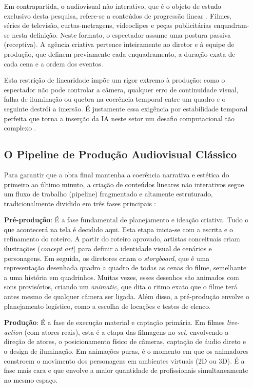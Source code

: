Em contrapartida, o audiovisual não interativo, que é o objeto de estudo exclusivo desta pesquisa, refere-se a conteúdos de progressão linear \citep{gavran2025}. Filmes, séries de televisão, curtas-metragens, videoclipes e peças publicitárias enquadram-se nesta definição. Neste formato, o espectador assume uma postura passiva (receptiva). A agência criativa pertence inteiramente ao diretor e à equipe de produção, que definem previamente cada enquadramento, a duração exata de cada cena e a ordem dos eventos.

Esta restrição de linearidade impõe um rigor extremo à produção: como o espectador não pode controlar a câmera, qualquer erro de continuidade visual, falha de iluminação ou quebra na coerência temporal entre um quadro e o seguinte destrói a imersão. É justamente essa exigência por estabilidade temporal perfeita que torna a inserção da IA neste setor um desafio computacional tão complexo \citep{yin2025spatiotemporal}.

\subsection{O Pipeline de Produção Audiovisual Clássico}
\label{subsec:pipeline}

Para garantir que a obra final mantenha a coerência narrativa e estética do primeiro ao último minuto, a criação de conteúdos lineares não interativos segue um fluxo de trabalho (pipeline) fragmentado e altamente estruturado, tradicionalmente dividido em três fases principais \citep{orak2024, gavran2025}:

\textbf{Pré-produção}: É a fase fundamental de planejamento e ideação criativa. Tudo o que acontecerá na tela é decidido aqui. Esta etapa inicia-se com a escrita e o refinamento do roteiro. A partir do roteiro aprovado, artistas conceituais criam ilustrações (\textit{concept art}) para definir a identidade visual de cenários e personagens. Em seguida, os diretores criam o \textit{storyboard}, que é uma representação desenhada quadro a quadro de todas as cenas do filme, semelhante a uma história em quadrinhos. Muitas vezes, esses desenhos são animados com sons provisórios, criando um \textit{animatic}, que dita o ritmo exato que o filme terá antes mesmo de qualquer câmera ser ligada. Além disso, a pré-produção envolve o planejamento logístico, como a escolha de locações e testes de elenco.

\textbf{Produção}: É a fase de execução material e captação primária. Em filmes \textit{live-action} (com atores reais), esta é a etapa das filmagens no \textit{set}, envolvendo a direção de atores, o posicionamento físico de câmeras, captação de áudio direto e o design de iluminação. Em animações puras, é o momento em que os animadores constroem o movimento dos personagens em ambientes virtuais (2D ou 3D). É a fase mais cara e que envolve a maior quantidade de profissionais simultaneamente no mesmo espaço.

